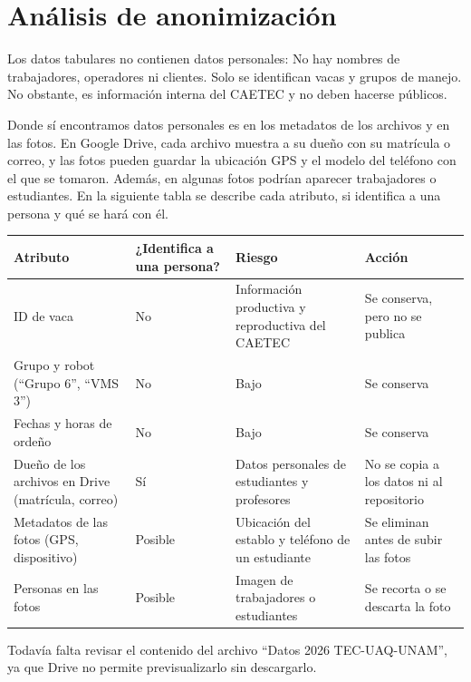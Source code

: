 \section{Análisis de anonimización}

Los datos tabulares no contienen datos personales: No hay nombres de trabajadores, operadores ni clientes. Solo se identifican vacas y grupos de manejo. No obstante, es información interna del CAETEC y no deben hacerse públicos.

Donde sí encontramos datos personales es en los metadatos de los archivos y en las fotos. En Google Drive, cada archivo muestra a su dueño con su matrícula o correo, y las fotos pueden guardar la ubicación GPS y el modelo del teléfono con el que se tomaron. Además, en algunas fotos podrían aparecer trabajadores o estudiantes. En la siguiente tabla se describe cada atributo, si identifica a una persona y qué se hará con él.

\begin{table}[htbp]
  \centering
  \small
  \begin{tabularx}{\textwidth}{>{\raggedright\arraybackslash}X>{\raggedright\arraybackslash}p{}>{\raggedright\arraybackslash}X>{\raggedright\arraybackslash}X}
    \toprule
    Atributo & ¿Identifica a una persona? & Riesgo & Acción \\
    \midrule
    ID de vaca & No & Información productiva y reproductiva del CAETEC & Se conserva, pero no se publica \\
    Grupo y robot (“Grupo 6”, “VMS 3”) & No & Bajo & Se conserva \\
    Fechas y horas de ordeño & No & Bajo & Se conserva \\
    Dueño de los archivos en Drive (matrícula, correo) & Sí & Datos personales de estudiantes y profesores & No se copia a los datos ni al repositorio \\
    Metadatos de las fotos (GPS, dispositivo) & Posible & Ubicación del establo y teléfono de un estudiante & Se eliminan antes de subir las fotos \\
    Personas en las fotos & Posible & Imagen de trabajadores o estudiantes & Se recorta o se descarta la foto \\
    \bottomrule
  \end{tabularx}
\end{table}

Todavía falta revisar el contenido del archivo “Datos 2026 TEC-UAQ-UNAM”, ya que Drive no permite previsualizarlo sin descargarlo.
